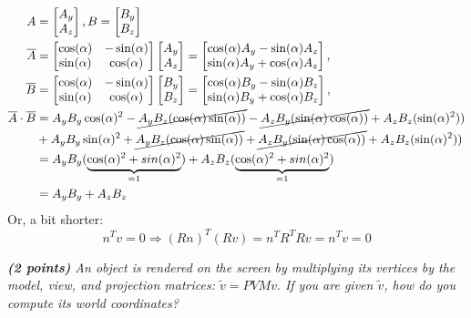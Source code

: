 \documentclass[a4paper,10pt]{article}
\begin{document}
\[\begin{aligned} 
A&=\begin{bmatrix}
A_y\\ 
A_z
\end{bmatrix},B=\begin{bmatrix}
B_y\\ 
B_z
\end{bmatrix}\\
\overline{A}&=\begin{bmatrix}
\cos(\alpha) & -\sin(\alpha)\\ 
\sin(\alpha) &\cos(\alpha)
\end{bmatrix}
\begin{bmatrix}
A_y\\ 
A_z
\end{bmatrix}=
\begin{bmatrix}
\cos(\alpha)A_y-\sin(\alpha)A_z\\ 
\sin(\alpha)A_y+\cos(\alpha)A_z
\end{bmatrix},\\
\overline{B}&=
\begin{bmatrix}
\cos(\alpha)&-\sin(\alpha)\\ 
\sin(\alpha)&\cos(\alpha)
\end{bmatrix}
\begin{bmatrix}
B_y\\ 
B_z
\end{bmatrix}=\begin{bmatrix}
\cos(\alpha)B_y-\sin(\alpha)B_z\\ 
\sin(\alpha)B_y+\cos(\alpha)B_z
\end{bmatrix},\\
\overline{A}\cdot\overline{B}&=A_yB_y\cos(\alpha)^2-\cancel{A_yB_z(\cos(\alpha)\sin(\alpha))}-\cancel{A_zB_y(\sin(\alpha)\cos(\alpha))}+A_zB_z(\sin(\alpha)^2))\\
&+A_yB_y\sin(\alpha)^2+\cancel{A_yB_z(\cos(\alpha)\sin(\alpha))}+\cancel{A_zB_y(\sin(\alpha)\cos(\alpha))}+A_zB_z(\sin(\alpha)^2))\\
&=A_yB_y(\underbrace{\cos(\alpha)^2+sin(\alpha)^2}_{=1})+A_zB_z(\underbrace{\cos(\alpha)^2+sin(\alpha)^2}_{=1})\\
&=A_yB_y+A_zB_z
\end{aligned}\]
Or, a bit shorter:
\[n^Tv=0\Rightarrow(Rn)^T(Rv)=n^TR^TRv=n^Tv=0\]

\textit{\textbf{(2 points)} An object is rendered on the screen by multiplying its vertices by the model, view, and projection matrices: $\tilde{v} = PVMv.$ If you are given $\tilde{v}$, how do you compute its world coordinates?}\\
\end{document}
